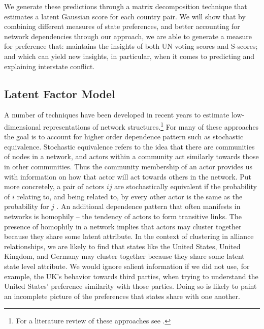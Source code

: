 We generate these predictions through a matrix decomposition technique that estimates a latent Gaussian score for each country pair. We will show that by combining different measures of state preferences, and better accounting for network dependencies through our approach, we are able to generate a measure for preference that: maintains the insights of both UN voting scores and S-scores; and which can yield new insights, in particular, when it comes to predicting and explaining interstate conflict.

\subsection*{Latent Factor Model}

A number of techniques have been developed in recent years to estimate low-dimensional representations of network structures.\footnote{For a literature review of these approaches see \citet{goldenberg:etal:2010}.} For many of these approaches the goal is to account for higher order dependence pattern such as stochastic equivalence. Stochastic equivalence refers to the idea that there are communities of nodes in a network, and actors within a community act similarly towards those in other communities. Thus the community membership of an actor provides us with information on how that actor will act towards others in the network. Put more concretely, a pair of actors $ij$ are stochastically equivalent if the probability of $i$ relating to, and being related to, by every other actor is the same as the probability for $j$ \citep{anderson:etal:1992}. %
An additional dependence pattern that often manifests in networks is homophily -- the tendency of actors to form transitive links. The presence of homophily in a network implies that actors may cluster together because they share some latent attribute. In the context of clustering in alliance relationships, we are likely to find that states like the United States, United Kingdom, and Germany may cluster together because they share some latent state level attribute. We would ignore salient information if we did not use, for example, the UK's behavior towards third parties, when trying to understand the United States' preference similarity with those parties. Doing so is likely to paint an incomplete picture of the preferences that states share with one another.

